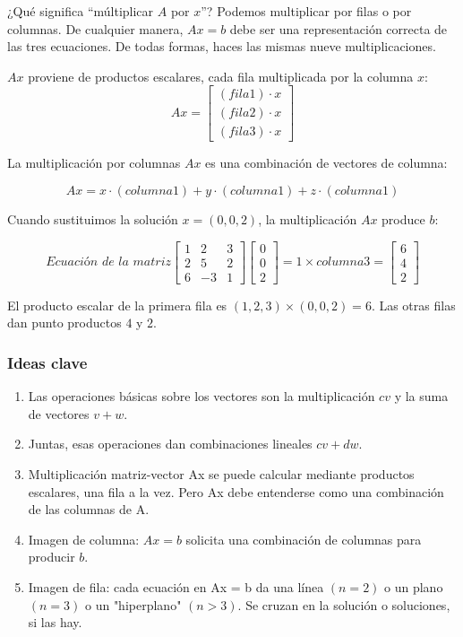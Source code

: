 ¿Qué significa ``múltiplicar $A$ por $x$''? Podemos multiplicar por filas o
por columnas. De cualquier manera, $Ax = b$ debe ser una representación correcta de las tres ecuaciones.
De todas formas, haces las mismas nueve multiplicaciones.

$Ax$ proviene de productos escalares, cada fila multiplicada por la columna $x$:
\begin{equation}
	Ax= \begin{bmatrix} (fila1)\cdot x\\(fila2)\cdot x\\(fila3)\cdot x \end{bmatrix}
\end{equation}

La multiplicación por columnas $Ax$ es una combinación de vectores de columna:

\begin{equation}
	Ax= x\cdot (columna1) + y\cdot (columna1) + z\cdot (columna1)
\end{equation}

Cuando sustituimos la solución $x = (0,0,2)$, la multiplicación $Ax$ produce $b$:

\begin{equation*}
	\textit{Ecuación de la matriz} \begin{bmatrix} 1&2&3\\2&5&2\\6&-3&1 \end{bmatrix} \begin{bmatrix} 0\\0\\2 \end{bmatrix} = 1\times columna3 = \begin{bmatrix} 6\\4\\2 \end{bmatrix}
\end{equation*}

El producto escalar de la primera fila es $(1,2,3)\times (0,0,2) = 6$. Las otras filas dan punto
productos $4$ y $2$.

\subsubsection{Ideas clave}
\begin{enumerate}
	\item Las operaciones básicas sobre los vectores son la multiplicación $cv$ y la suma de vectores $v + w$.
	\item Juntas, esas operaciones dan combinaciones lineales $cv + dw$.
	\item Multiplicación matriz-vector Ax se puede calcular mediante productos escalares, una fila a la vez. Pero Ax debe entenderse como una combinación de las columnas de A.
	\item Imagen de columna: $Ax = b$ solicita una combinación de columnas para producir $b$.
	\item Imagen de fila: cada ecuación en Ax = b da una línea $(n = 2)$ o un plano $(n = 3)$ o un
	      "hiperplano" $(n> 3)$. Se cruzan en la solución o soluciones, si las hay.
\end{enumerate}
